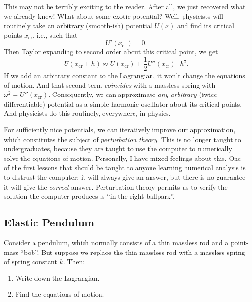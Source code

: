 \begin{remark}
This may not be terribly exciting to the reader. After all, we just
recovered what we already knew! What about some exotic potential? Well,
physicists will routinely take an arbitrary (smooth-ish) potential
$U(x)$ and find its critical points $x_{\text{cr}}$, i.e., such that
\begin{equation}
U'(x_{\text{cr}})=0.
\end{equation}
Then Taylor expanding to second order about this critical point, we get
\begin{equation}
U(x_{\text{cr}}+h)\approx U(x_{\text{cr}})
+ \frac{1}{2}U''(x_{\text{cr}})\cdot h^{2}.
\end{equation}
If we add an arbitrary constant to the Lagrangian, it won't change the
equations of motion. And that second term \emph{coincides} with a
massless spring with $\omega^{2} = U''(x_{\text{cr}})$. Consequently, we
can approximate \emph{any arbitrary} (twice differentiable) potential as
a simple harmonic oscillator about its critical points. And physicists
do this routinely, everywhere, in physics.

For sufficiently nice potentials, we can iteratively improve our
approximation, which constitutes the subject of \emph{perturbation theory}.
This is no longer taught to undergraduates, because they are taught to
use the computer to numerically solve the equations of
motion. Personally, I have mixed feelings about this. One of the first
lessons that should be taught to anyone learning numerical analysis is
to distrust the computer: it will always give an answer, but there is no
guarantee it will give the \emph{correct} answer. Perturbation theory
permits us to verify the solution the computer produces is ``in the
right ballpark''.
\end{remark}

\subsection{Elastic Pendulum}

Consider a pendulum, which normally consists of a thin massless rod and
a point-mass ``bob''. But suppose we replace the thin massless rod with
a massless spring of spring constant $k$. Then:
\begin{enumerate}
\item Write down the Lagrangian.
\item Find the equations of motion.
\end{enumerate}

